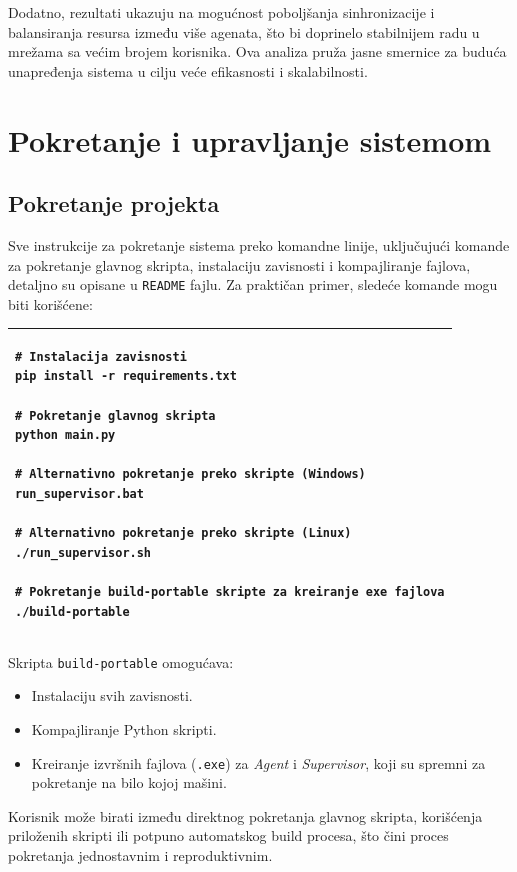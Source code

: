\documentclass[a4paper,12pt]{article}
\begin{document}
Dodatno, rezultati ukazuju na mogućnost poboljšanja sinhronizacije i balansiranja resursa između više agenata, što bi doprinelo stabilnijem radu u mrežama sa većim brojem korisnika. Ova analiza pruža jasne smernice za buduća unapređenja sistema u cilju veće efikasnosti i skalabilnosti.
\newpage
\section{Pokretanje i upravljanje sistemom}


\subsection{Pokretanje projekta}

Sve instrukcije za pokretanje sistema preko komandne linije, uključujući komande za pokretanje glavnog skripta, instalaciju zavisnosti i kompajliranje fajlova, detaljno su opisane u \texttt{README} fajlu. Za praktičan primer, sledeće komande mogu biti korišćene:

\begin{center}
\begin{tabular}{|p{14cm}|}  %
\hline
\begin{verbatim}
# Instalacija zavisnosti
pip install -r requirements.txt

# Pokretanje glavnog skripta
python main.py

# Alternativno pokretanje preko skripte (Windows)
run_supervisor.bat

# Alternativno pokretanje preko skripte (Linux)
./run_supervisor.sh

# Pokretanje build-portable skripte za kreiranje exe fajlova
./build-portable
\end{verbatim} \\
\hline
\end{tabular}
\end{center}

Skripta \texttt{build-portable} omogućava:
\begin{itemize}
    \item Instalaciju svih zavisnosti.
    \item Kompajliranje Python skripti.
    \item Kreiranje izvršnih fajlova (\texttt{.exe}) za \textit{Agent} i \textit{Supervisor}, koji su spremni za pokretanje na bilo kojoj mašini.
\end{itemize}

Korisnik može birati između direktnog pokretanja glavnog skripta, korišćenja priloženih skripti ili potpuno automatskog build procesa, što čini proces pokretanja jednostavnim i reproduktivnim.
\end{document}
